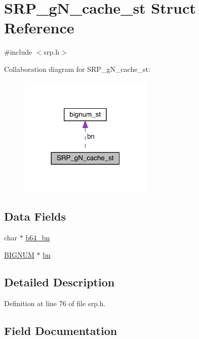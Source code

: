 \hypertarget{struct_s_r_p__g_n__cache__st}{}\section{S\+R\+P\+\_\+g\+N\+\_\+cache\+\_\+st Struct Reference}
\label{struct_s_r_p__g_n__cache__st}


{\ttfamily \#include $<$srp.\+h$>$}



Collaboration diagram for S\+R\+P\+\_\+g\+N\+\_\+cache\+\_\+st\+:\nopagebreak
\begin{figure}[H]
\begin{center}
\leavevmode
\includegraphics[width=180pt]{struct_s_r_p__g_n__cache__st__coll__graph}
\end{center}
\end{figure}
\subsection*{Data Fields}
\begin{DoxyCompactItemize}
\item 
char $\ast$ \hyperlink{struct_s_r_p__g_n__cache__st_a6e0fc2098300505ba2325dffeffa87f4}{b64\+\_\+bn}
\item 
\hyperlink{crypto_2ossl__typ_8h_a6fb19728907ec6515e4bfb716bffa141}{B\+I\+G\+N\+UM} $\ast$ \hyperlink{struct_s_r_p__g_n__cache__st_abfa3c2ad758c9f55e6324c3061540298}{bn}
\end{DoxyCompactItemize}


\subsection{Detailed Description}


Definition at line 76 of file srp.\+h.



\subsection{Field Documentation}
